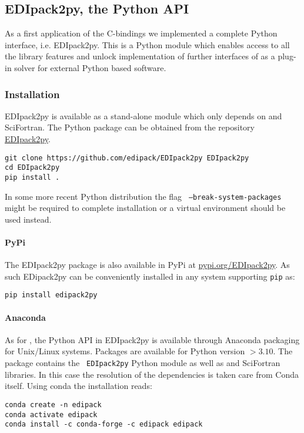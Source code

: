 \documentclass[edipack2.tex]{subfiles}
\begin{document}




\subsection{EDIpack2py, the Python API}\label{sSecInteropEDIpy}
As a first application of the \NAME C-bindings we implemented a
complete Python interface, i.e. EDIpack2py. This is a Python module which
enables access to all the library features and unlock implementation of
further interfaces of \NAME as a plug-in solver for external Python
based software.    


\subsubsection{Installation}\label{sSecInteropEDIpyInstallation}
EDIpack2py is available as a stand-alone
module which only depends on \NAME and SciFortran.
The Python package can be obtained from the repository
\href{https://github.com/EDIpack/EDIpack2py}{EDIpack2py}.

\begin{lstlisting}[style=mybash]
git clone https://github.com/edipack/EDIpack2py EDIpack2py
cd EDIpack2py
pip install . 
\end{lstlisting}
In some more recent Python distribution the flag {\tt
  --break-system-packages} might be required to complete
installation or a virtual environment should be used instead. 


\paragraph{PyPi}
The EDIpack2py package is also available in PyPi at
\href{https://pypi.org/project/EDIpack2py/}{pypi.org/EDIpack2py}. As such
EDipack2py can be conveniently installed in any system supporting {\tt pip} as:

\begin{lstlisting}[style=mybash]
pip install edipack2py
\end{lstlisting}


\paragraph{Anaconda}
As for \NAME, the Python API in EDIpack2py is available through
Anaconda packaging for Unix/Linux systems. Packages are available for
Python version $>3.10$. The \NAME package contains the {\tt
  EDIpack2py} Python module as well as \NAME and SciFortran
libraries. In this case the resolution of the dependencies is
taken care from Conda itself. 
Using conda the installation reads:
\begin{lstlisting}[style=mybash]
conda create -n edipack
conda activate edipack
conda install -c conda-forge -c edipack edipack
\end{lstlisting}
\end{document}
